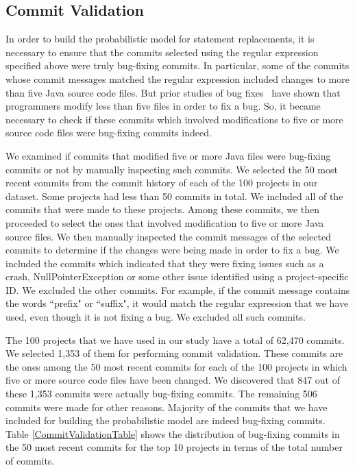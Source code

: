 
\subsection{Commit Validation}

In order to build the probabilistic model for statement replacements, it is necessary to ensure that
the commits selected using the regular expression specified above were
truly bug-fixing commits. In particular, some of the commits whose commit
messages matched the regular expression included changes to more
than five Java source code files. But prior studies of bug fixes~\cite{zhong2015}
have shown that programmers modify less than five files in order to fix
a bug. So, it became necessary to check if these commits which involved
modifications to five or more source code files were bug-fixing commits indeed.

We examined if commits that modified five or more Java files were bug-fixing
commits or not by manually inspecting such commits. We selected the 50 most recent
commits from the commit history of each of the 100 projects in our dataset. Some projects had less than
50 commits in total. We included all of the commits that were made to these projects.
Among these commits, we then proceeded to select the ones that involved modification
to five or more Java source files. We then manually inspected the commit messages
of the selected commits to determine if the changes were being made in order to
fix a bug. We included the commits which indicated that they were fixing issues
such as a crash, NullPointerException or some other issue identified using a project-specific ID.
We excluded the other commits. For example, if the commit message contains the words
``prefix" or ``suffix", it would match the regular expression that we have used, even though
it is not fixing a bug. We excluded all such commits.

The 100 projects that we have used in our study have a total of 62,470 commits.
We selected 1,353 of them for performing commit validation. These commits are
the ones among the 50 most recent commits for each of the 100 projects in which five or more source code files have been changed. We discovered that 847 out of these 1,353 commits
were actually bug-fixing commits. The remaining 506 commits were made for
other reasons. Majority of the commits that we have included for building the
probabilistic model are indeed bug-fixing commits. Table \ref{CommitValidationTable}
shows the distribution of bug-fixing commits in the 50 most recent commits for
the top 10 projects in terms of the total number of commits.

